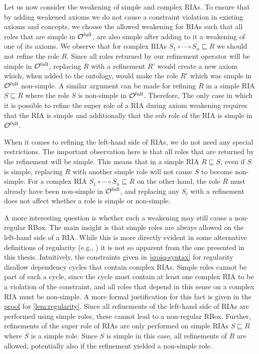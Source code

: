 
Let us now consider the weakening of simple and complex RIAs. To ensure that by adding weakened axioms we do not cause a constraint violation in existing axioms and concepts, we choose the allowed weakening for RIAs such that all roles that are simple in ${\mathcal{O}^\textnormal{full}}$, are also simple after adding to it a weakening of one of its axioms. We observe that for complex RIAs $S_1 \circ \cdots \circ S_n \sqsubseteq R$ we should not refine the role $R$. Since all roles returned by our refinement operator will be simple in ${\mathcal{O}^\textnormal{full}}$, replacing $R$ with a refinement $R'$ would create a new axiom which, when added to the ontology, would make the role $R'$ which was simple in ${\mathcal{O}^\textnormal{full}}$ non-simple. A similar argument can be made for refining $R$ in a simple RIA $S \sqsubseteq R$ where the role $S$ is non-simple in ${\mathcal{O}^\textnormal{full}}$. Therefore, The only case in which it is possible to refine the super role of a RIA during axiom weakening requires that the RIA is simple and additionally that the sub role of the RIA is simple in ${\mathcal{O}^\textnormal{full}}$.

When it comes to refining the left-hand side of RIAs, we do not need any special restrictions. The important observation here is that all roles that are returned by the refinement will be simple. This means that in a simple RIA $R \sqsubseteq S$, even if $S$ is simple, replacing $R$ with another simple role will not cause $S$ to become non-simple. For a complex RIA $S_1 \circ \cdots \circ S_n \sqsubseteq R$ on the other hand, the role $R$ must already have been non-simple in ${\mathcal{O}^\textnormal{full}}$, and replacing any $S_i$ with a refinement does not affect whether a role is simple or non-simple.

A more interesting question is whether such a weakening may still cause a non-regular RBox. The main insight is that simple roles are always allowed on the left-hand side of a RIA. While this is more directly evident in some alternative definitions of regularity (e.g., \cite{rudolph2011foundations}) it is not so apparent from the one presented in this thesis. Intuitively, the constraints given in \cref{sroiq-syntax} for regularity disallow dependency cycles that contain complex RIAs. Simple roles cannot be part of such a cycle, since the cycle must contain at least one complex RIA to be a violation of the constraint, and all roles that depend in this sense on a complex RIA must be non-simple. A more formal justification for this fact is given in the \hyperref[proof:regularity]{proof} for \cref{lem:regularity}. Since all refinements of the left-hand side of RIAs are performed using simple roles, these cannot lead to a non-regular RBox. Further, refinements of the super role of RIAs are only performed on simple RIAs $S \sqsubseteq R$ where $S$ is a simple role. Since $S$ is simple in this case, all refinements of $R$ are allowed, potentially also if the refinement yielded a non-simple role.

